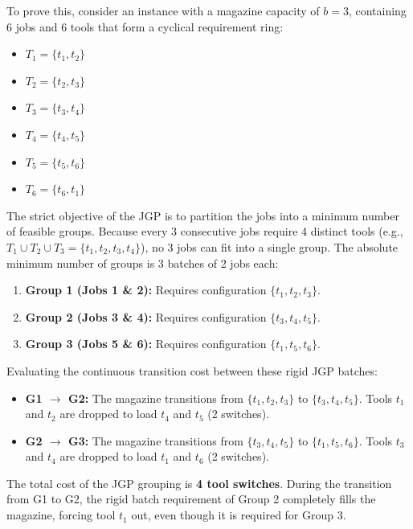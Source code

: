 \documentclass[12pt]{article}
\begin{document}
To prove this, consider an instance with a magazine capacity of $b = 3$, containing 6 jobs and 6 tools that form a cyclical requirement ring:
\begin{itemize}[noitemsep]
	\item $T_1 = \{t_1, t_2\}$
	\item $T_2 = \{t_2, t_3\}$
	\item $T_3 = \{t_3, t_4\}$
	\item $T_4 = \{t_4, t_5\}$
	\item $T_5 = \{t_5, t_6\}$
	\item $T_6 = \{t_6, t_1\}$
\end{itemize}

The strict objective of the JGP is to partition the jobs into a minimum number of feasible groups. Because every 3 consecutive jobs require 4 distinct tools (e.g., $T_1 \cup T_2 \cup T_3 = \{t_1, t_2, t_3, t_4\}$), no 3 jobs can fit into a single group. The absolute minimum number of groups is 3 batches of 2 jobs each:
\begin{enumerate}[noitemsep]
	\item \textbf{Group 1 (Jobs 1 \& 2):} Requires configuration $\{t_1, t_2, t_3\}$.
	\item \textbf{Group 2 (Jobs 3 \& 4):} Requires configuration $\{t_3, t_4, t_5\}$.
	\item \textbf{Group 3 (Jobs 5 \& 6):} Requires configuration $\{t_1, t_5, t_6\}$.
\end{enumerate}

Evaluating the continuous transition cost between these rigid JGP batches:
\begin{itemize}[noitemsep]
	\item \textbf{G1 $\to$ G2:} The magazine transitions from $\{t_1, t_2, t_3\}$ to $\{t_3, t_4, t_5\}$. Tools $t_1$ and $t_2$ are dropped to load $t_4$ and $t_5$ (2 switches).
	\item \textbf{G2 $\to$ G3:} The magazine transitions from $\{t_3, t_4, t_5\}$ to $\{t_1, t_5, t_6\}$. Tools $t_3$ and $t_4$ are dropped to load $t_1$ and $t_6$ (2 switches).
\end{itemize}
The total cost of the JGP grouping is \textbf{4 tool switches}. During the transition from G1 to G2, the rigid batch requirement of Group 2 completely fills the magazine, forcing tool $t_1$ out, even though it is required for Group 3.
\end{document}

